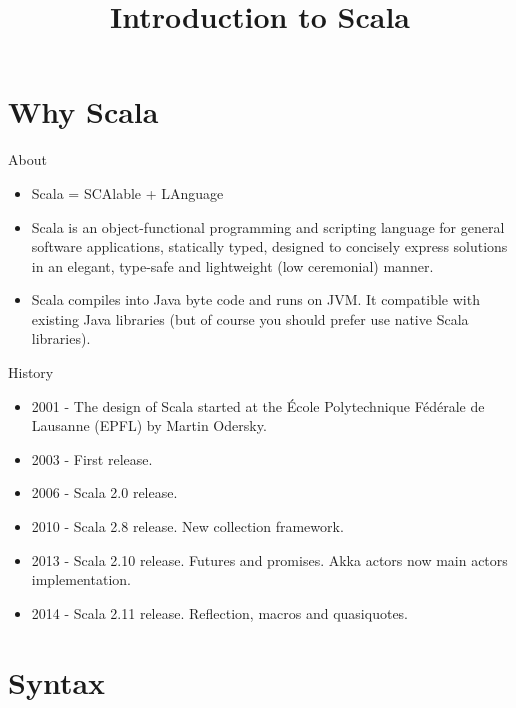 

\usepackage{tikz}
\usepackage{tikz-uml}

\title{Introduction to Scala}



\begin{frame}
    \titlepage
\end{frame}

\section{Why Scala}

\begin{frame}{About}

\begin{itemize}
  \item Scala = SCAlable + LAnguage

  \item Scala is an object-functional programming and scripting language for general software applications, statically typed, designed to concisely express solutions in an elegant, type-safe and lightweight (low ceremonial) manner.

  \item Scala compiles into Java byte code and runs on JVM. It compatible with existing Java libraries (but of course you should prefer use native Scala libraries).
\end{itemize}

\end{frame}

\begin{frame}{History}

\begin{itemize}
  \item 2001 - The design of Scala started at the École Polytechnique Fédérale de Lausanne (EPFL) by Martin Odersky.
  \item 2003 - First release.
  \item 2006 - Scala 2.0 release.
  \item 2010 - Scala 2.8 release. New collection framework.
  \item 2013 - Scala 2.10 release. Futures and promises. Akka actors now main actors implementation.
  \item 2014 - Scala 2.11 release. Reflection, macros and quasiquotes.
\end{itemize}
\end{frame}

\section{Syntax}

